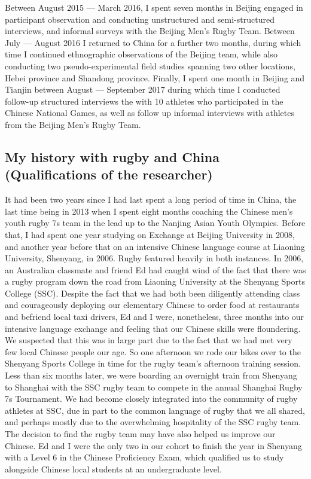 Between August 2015 --- March 2016, I spent seven months in Beijing engaged in participant observation and conducting unstructured and semi-structured interviews, and informal surveys with the Beijing Men's Rugby Team. Between July --- August 2016 I returned to China for a further two months, during which time I continued ethnographic observations of the Beijing team, while also conducting two pseudo-experimental field studies spanning two other locations, Hebei province and Shandong province. Finally, I spent one month in Beijing and Tianjin between August --- September 2017 during which time I conducted follow-up structured interviews the with 10 athletes who participated in the Chinese National Games, as well as follow up informal interviews with athletes from the Beijing Men's Rugby Team.








\subsection{My history with rugby and China (Qualifications of the researcher)}
It had been two years since I had last spent a long period of time in China, the last time being in 2013 when I spent eight months coaching the Chinese men's youth rugby 7s team in the lead up to the Nanjing Asian Youth Olympics.  Before that, I had spent one year studying on Exchange at Beijing University in 2008, and another year before that on an intensive Chinese language course at Liaoning University, Shenyang, in 2006.  Rugby featured heavily in both instances.  In 2006, an Australian classmate and friend Ed had caught wind of the fact that there was a rugby program down the road from Liaoning University at the Shenyang Sports College (SSC).  Despite the fact that we had both been diligently attending class and courageously deploying our elementary Chinese to order food at restaurants and befriend local taxi drivers, Ed and I were, nonetheless, three months into our intensive language exchange and feeling that our Chinese skills were floundering.  We suspected that this was in large part due to the fact that we had met very few local Chinese people our age.  So one afternoon we rode our bikes over to the Shenyang Sports College in time for the rugby team's afternoon training session.  Less than six months later, we were boarding an overnight train from Shenyang to Shanghai with the SSC rugby team to compete in the annual Shanghai Rugby 7s Tournament.  We had become closely integrated into the community of rugby athletes at SSC, due in part to the common language of rugby that we all shared, and perhaps mostly due to the overwhelming hospitality of the SSC rugby team.  The decision to find the rugby team may have also helped us improve our Chinese. Ed and I were the only two in our cohort to finish the year in Shenyang with a Level 6 in the Chinese Proficiency Exam, which qualified us to study alongside Chinese local students at an undergraduate level.

